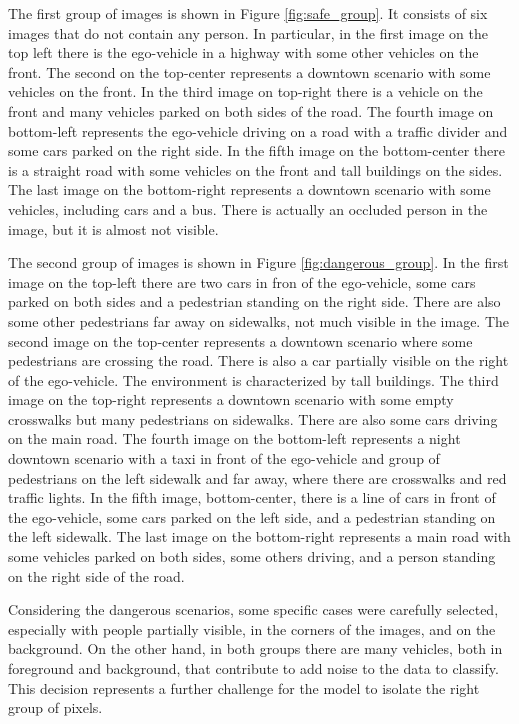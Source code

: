 The first group of images is shown in Figure \ref{fig:safe_group}. It consists 
of six images that do not contain any person. In particular, in the first image 
on the top left there is the ego-vehicle in a highway with some other vehicles 
on the front. The second on the top-center represents a downtown scenario with 
some vehicles on the front. In the third image on top-right there is a vehicle 
on the front and many vehicles parked on both sides of the road. The fourth 
image on bottom-left represents the ego-vehicle driving on a road with a traffic 
divider and some cars parked on the right side. In the fifth image on the 
bottom-center there is a straight road with some vehicles on the front and tall 
buildings on the sides. The last image on the bottom-right represents a 
downtown scenario with some vehicles, including cars and a bus. There is 
actually an occluded person in the image, but it is almost not visible.

The second group of images is shown in Figure \ref{fig:dangerous_group}. 
In the first image on the top-left there are two cars in fron of the ego-vehicle, 
some cars parked on both sides and a pedestrian standing on the right side. There 
are also some other pedestrians far away on sidewalks, not much visible in the 
image.
The second image on the top-center represents a downtown scenario where some 
pedestrians are crossing the road. There is also a car partially visible on the 
right of the ego-vehicle. The environment is characterized by tall buildings.
The third image on the top-right represents a downtown scenario with some 
empty crosswalks but many pedestrians on sidewalks. There are also some cars 
driving on the main road.
The fourth image on the bottom-left represents a night downtown scenario with a 
taxi in front of the ego-vehicle and group of pedestrians on the left sidewalk 
and far away, where there are crosswalks and red traffic lights.
In the fifth image, bottom-center, there is a line of cars in front of the 
ego-vehicle, some cars parked on the left side, and a pedestrian standing on the 
left sidewalk.
The last image on the bottom-right represents a main road with some vehicles 
parked on both sides, some others driving, and a person standing on the right 
side of the road.

Considering the dangerous scenarios, some specific cases were carefully selected,
especially with people partially visible, in the corners of the images, and 
on the background. On the other hand, in both groups there are many vehicles, both 
in foreground and background, that contribute to add noise to the data to 
classify.
This decision represents a further challenge for the model to 
isolate the right group of pixels.


